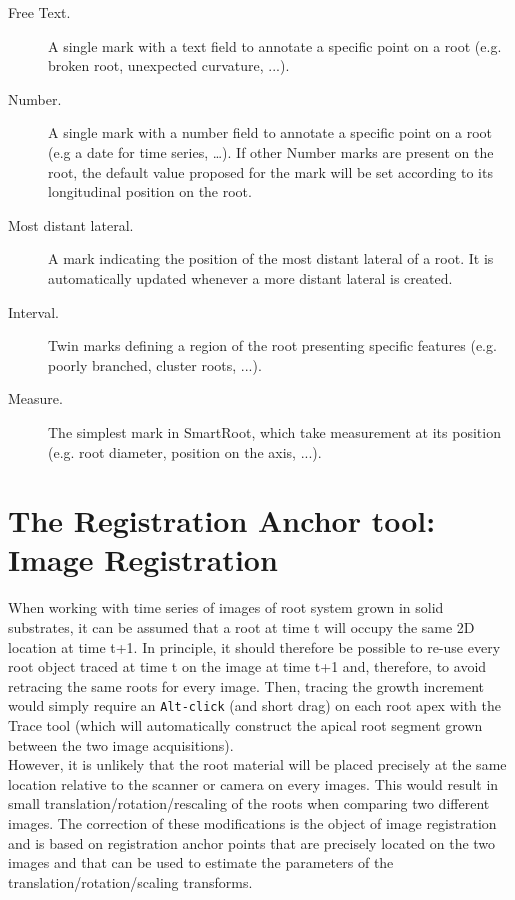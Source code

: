 \documentclass[a4paper,english,10pt]{report}
\begin{document}
\begin{description}

\item [Free Text.] A single mark with a text field to annotate a specific point on a root (e.g. broken root, unexpected curvature, ...).

\item [Number.] A single mark with a number field to annotate a specific point on a root (e.g a date for time series, …). If other Number marks are present on the root, the default value proposed for the mark will be set according to its longitudinal position on the root.

\item [Most distant lateral.] A mark indicating the position of the most distant lateral of a root. It is automatically updated whenever a more distant lateral is created.

\item [Interval.] Twin marks defining a region of the root presenting specific features (e.g. poorly branched, cluster roots, ...).

\item[Measure.] The simplest mark in SmartRoot, which take measurement at its position (e.g. root diameter, position on the axis, ...). 

\end{description}



{\color{coolSection}\section[The Registration Anchor tool]{The Registration Anchor tool: Image Registration}}
\label{chapreg}

When working with time series of images of root system grown in solid substrates, it can be assumed that a root at time t will occupy the same 2D location at time t+1. In principle, it should therefore be possible to re-use every root object traced at time t on the image at time t+1 and, therefore, to avoid retracing the same roots for every image. Then, tracing the growth increment would simply require an \verb|Alt-click| (and short drag) on each root apex with the Trace tool (which will automatically construct the apical root segment grown between the two image acquisitions).\\

However, it is unlikely that the root material will be placed precisely at the same location relative to the scanner or camera on every images. This would result in small translation/rotation/rescaling of the roots when comparing two different images. The correction of these modifications is the object of image registration and is based on registration anchor points that are precisely located on the two images and that can be used to estimate the parameters of the translation/rotation/scaling transforms.\\
\end{document}
